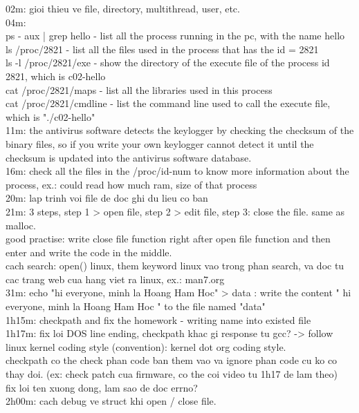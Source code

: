 02m: gioi thieu ve file, directory, multithread, user, etc.
\\04m:
\\ps - aux | grep hello - list all the process running in the pc, with the name hello
\\ls /proc/2821 - list all the files used in the process that has the id = 2821
\\ls -l /proc/2821/exe - show the directory of the execute file of the process id 2821, which is c02-hello
\\cat /proc/2821/maps - list all the libraries used in this process
\\cat /proc/2821/cmdline - list the command line used to call the execute file, which is "./c02-hello"
\\11m: the antivirus software detects the keylogger by checking the checksum of the binary files, so if you write your own keylogger cannot detect it until the checksum is updated into the antivirus software database.
\\16m: check all the files in the /proc/id-num to know more information about the process, ex.: could read how much ram, size of that process
\\20m: lap trinh voi file de doc ghi du lieu co ban
\\21m: 3 steps, step 1 > open file, step 2 > edit file, step 3: close the file. same as malloc.
\\good practise: write close file function right after open file function and then enter and write the code in the middle.
\\cach search: open() linux, them keyword linux vao trong phan search, va doc tu cac trang web cua hang viet ra linux, ex.: man7.org
\\31m: echo "hi everyone, minh la Hoang Ham Hoc" > data : write the content " hi everyone, minh la Hoang Ham Hoc " to the file named "data"
\\1h15m: checkpath and fix the homework - writing name into existed file
\\1h17m: fix loi DOS line ending, checkpath khac gi response tu gcc? -> follow linux kernel coding style (convention): kernel dot org coding style. 
\\checkpath co the check phan code ban them vao va ignore phan code cu ko co thay doi. (ex: check patch cua firmware, co the coi video tu 1h17 de lam theo)
\\fix loi ten xuong dong, lam sao de doc errno?
\\2h00m: cach debug ve struct khi open / close file.


